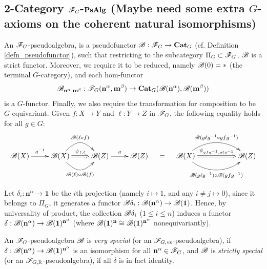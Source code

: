 \documentclass{article}
\begin{document}
\hfil

\subsection{2-Category $\F_G$-$\mathbf{PsAlg}$ (Maybe need some extra $G$-axioms on the coherent natural isomorphisms)}

\begin{defn}[$\F_G$-pseudoalgebra]
    An $\F_G$-pseudoalgebra, is a pseudofunctor $\mathscr{B}:\mathscr{F}_G\rightarrow \mathbf{Cat}_G$ (cf. Definition \ref{defn_pseudofunctor}), such that restricting to the subcategory $\Pi_G\subset\mathscr{F}_G$, $\mathscr{B}$ is a strict functor. Moreover, we require it to be reduced, namely $\mathscr{B}(0)=*$ (the terminal $G$-category), and each hom-functor 
    \begin{align*}
        \mathscr{B}_{\mathbf{n}^\alpha,\mathbf{m}^\beta}:\mathscr{F}_G(\mathbf{n}^\alpha,\mathbf{m}^\beta)\rightarrow \mathbf{Cat}_G(\mathscr{B}(\mathbf{n}^\alpha),\mathscr{B}(\mathbf{m}^\beta))
    \end{align*}
    is a $G$-functor. Finally, we also require the transformation for composition to be $G$-equivariant. Given $f:X\rightarrow Y$ and $\ell:Y\rightarrow Z$ in $\F_G$, the following equality holds for all $g\in G$:
    \begin{align*}
        \xymatrix{
            \B(X) \ar[r]^-{g^{-1}} & \B(X) \ar@(ur,ul)[r]^-{\B(\ell\circ f)} \ar@(dr,dl)[r]_-{\B(\ell)\circ \B(f)} \ar@{=>}[r]^-{\psi_{f,\ell}} & \B(Z) \ar[r]^-{g} & \B(Z)
        } \quad=\quad \xymatrix{
            \B(X) \ar@(ur,ul)[rr]^-{\B(g\ell g^{-1}\circ gfg^{-1})} \ar@(dr,dl)[rr]_-{\B(g\ell g^{-1})\circ \B(gfg^{-1})} \ar@{=>}[rr]^-{\psi_{gfg^{-1},g\ell g^{-1}}} && \B(Z)
        }
    \end{align*}
\end{defn}

\hfil

Let $\delta_i:\mathbf{n}^\alpha\rightarrow\mathbf{1}$ be the $i$th projection (namely $i\mapsto 1$, and any $i\neq j\mapsto 0$), since it belongs to $\Pi_G$, it generates a functor $\mathscr{B}\delta_i:\mathscr{B}(\mathbf{n}^\alpha)\rightarrow \mathscr{B}(\mathbf{1})$. Hence, by universality of product, the collection $\mathscr{B}\delta_i$ ($1\leq i\leq n$) induces a functor $\delta:\mathscr{B}(\mathbf{n}^\alpha)\rightarrow \mathscr{B}(\mathbf{1})^{\mathbf{n}^\alpha}$ (where $\mathscr{B}(\mathbf{1})^{\mathbf{n}}\cong \mathscr{B}(\mathbf{1})^{\mathbf{n}^{\alpha}}$ nonequivariantly).

\begin{defn}
    An $\F_G$-pseudoalgebra $\mathscr{B}$ is \emph{very special} (or an $\mathscr{F}_{G,\mathrm{vs}}$-pseudoalgebra), if $\delta:\mathscr{B}(\mathbf{n}^\alpha)\rightarrow \mathscr{B}(\mathbf{1})^{\mathbf{n}^\alpha}$ is an isomorphism for all $\mathbf{n}^\alpha\in\mathscr{F}_G$, and $\mathscr{B}$ is \emph{strictly special} (or an $\mathscr{F}_{G,\mathbb{R}}$-pseudoalgebra), if all $\delta$ is in fact identity.
\end{defn}
\end{document}
